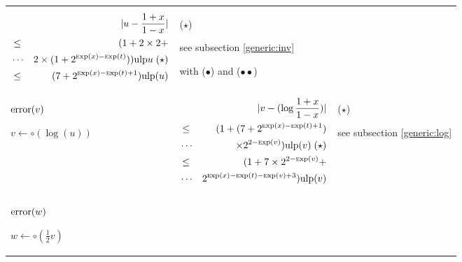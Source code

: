 \documentclass[12pt]{amsart}
\def\ulp{{\rm ulp}}
\def\Exp{{\rm \textsc exp}}
\begin{document}
\begin{center}
\begin{tabular}{l l l}
\begin{minipage}{7.5cm}
\begin{eqnarray}\nonumber
  &&|u-\frac{1+x}{1-x}| \\\nonumber
  &       \leq& (1+ 2 \times 2 + \\\nonumber
  &       \cdots& 2 \times (1+2^{\Exp(x)-\Exp(t)}))\ulp{u} \;(\star)\\\nonumber
  &       \leq& (7+2^{\Exp(x)-\Exp(t)+1})\ulp(u)
\end{eqnarray}


\end{minipage} &
\begin{minipage}{6cm}

($\star$)

see subsection \ref{generic:inv}

with ($\bullet$) and ($\bullet\bullet$)

\end{minipage}\\%
\begin{minipage}{2.5cm}
${\textnormal{error}}(v)$


$v \leftarrow \circ(\log(u)) $


\end{minipage} &
\begin{minipage}{7.5cm}

\begin{eqnarray}\nonumber
  &&|v-(\log{\frac{1+x}{1-x}})| \\\nonumber
  &       \leq& (1+(7+2^{\Exp(x)-\Exp(t)+1}) \\\nonumber
  &       \cdots&  \times 2^{2-\Exp(v)}) \ulp(v)\;(\star)\\\nonumber
  &       \leq& (1+7 \times 2^{2-\Exp(v)} +\\\nonumber
  &       \cdots&  2^{\Exp(x)-\Exp(t)-\Exp(v)+3}) \ulp(v)
\end{eqnarray}


\end{minipage} &
\begin{minipage}{6cm}

($\star$)

see subsection \ref{generic:log}

\end{minipage}\\%
\begin{minipage}{2.5cm}
${\textnormal{error}}(w)$


$w \leftarrow \circ(\frac{1}{2} v) $
\end{minipage} &
\begin{minipage}{7.5cm}


\end{minipage}
\end{tabular}
\end{center}
\end{document}
